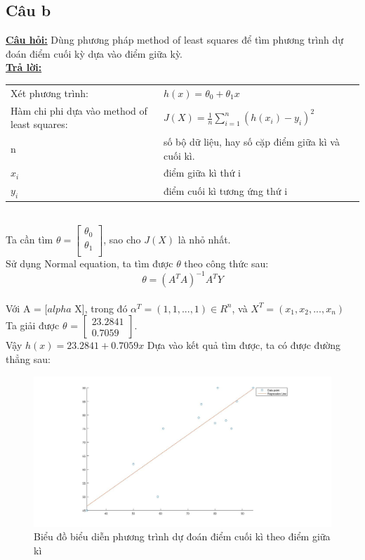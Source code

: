 \documentclass[a4paper 14pt]{extarticle}
\begin{document}
		\subsection{Câu b}
			\underline{\textbf{Câu hỏi:}} Dùng phương pháp method of least squares để tìm phương trình dự đoán điểm cuối kỳ dựa vào điểm giữa kỳ.\\
			\underline{\textbf{Trả lời:}}\\
			\begin{tabular}{p{2in} l}
				Xét phương trình: & $h(x) = \theta_0 + \theta_1x$\\
				Hàm chi phi dựa vào method of least squares: & $J(X) = \frac{1}{n}\sum\limits_{i = 1}^{n}(h(x_i) - y_i)^2$\\ 
				n&số bộ dữ liệu, hay số cặp điểm giữa kì và cuối kì.\\
				$x_i$&điểm giữa kì thứ i\\
				$y_i$&điểm cuối kì tương ứng thứ i\\
			\end{tabular}\\
			Ta cần tìm $\theta =$\( \begin{bmatrix} \theta_0\\ \theta_1\\	\end{bmatrix}\), sao cho $J(X)$ là nhỏ nhất.\\
			Sử dụng Normal equation, ta tìm được $\theta$ theo công thức sau:\\
			\begin{equation}
				\theta = (A^TA)^{-1}A^TY
			\end{equation}\\
		
			Với A = [$alpha$ X], trong đó $\alpha^T = (1,1,...,1) \in R^n$, và $X^T = (x_1,x_2,...,x_n)$\\
			Ta giải được $\theta$ = \(\begin{bmatrix} 23.2841\\0.7059 \end{bmatrix}\).\\
			Vậy $h(x) = 23.2841 + 0.7059x$
			Dựa vào kết quả tìm được, ta có được đường thẳng sau:\\
			\begin{figure}[H]
				\includegraphics[scale = 0.3]{regression}
				\caption{Biểu đồ biểu diễn phương trình dự đoán điểm cuối kì theo điểm giữa kì}
			\end{figure}
\end{document}

